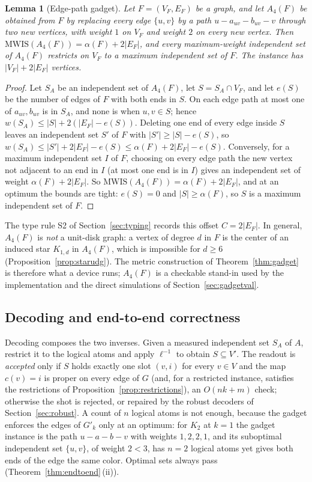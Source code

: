\documentclass[a4paper,fleqn]{cas-sc}
\newtheorem{lemma}[theorem]{Lemma}
\newcommand{\MWIS}{\mathrm{MWIS}}
\newcommand{\indep}{\alpha}
\newcommand{\rn}[1]{\textup{\textsc{\footnotesize #1}}}
\begin{document}
\begin{lemma}[Edge-path gadget]
\label{lem:pathgadget}
Let $F=(V_F,E_F)$ be a graph, and let $A_4(F)$ be obtained from $F$ by replacing
every edge $\{u,v\}$ by a path $u - a_{uv} - b_{uv} - v$ through two new
vertices, with weight $1$ on $V_F$ and weight $2$ on every new vertex. Then
$\MWIS(A_4(F)) = \indep(F) + 2|E_F|$, and every maximum-weight independent set of
$A_4(F)$ restricts on $V_F$ to a maximum independent set of $F$. The instance has
$|V_F|+2|E_F|$ vertices.
\end{lemma}

\begin{proof}
Let $S_A$ be an independent set of $A_4(F)$, let $S=S_A\cap V_F$, and let $e(S)$
be the number of edges of $F$ with both ends in $S$. On each edge path at most one
of $a_{uv},b_{uv}$ is in $S_A$, and none is when $u,v\in S$; hence
$w(S_A)\le |S| + 2(|E_F|-e(S))$. Deleting one end of every edge inside $S$ leaves
an independent set $S'$ of $F$ with $|S'|\ge|S|-e(S)$, so
$w(S_A)\le |S'| + 2|E_F| - e(S)\le \indep(F)+2|E_F|-e(S)$. Conversely, for a
maximum independent set $I$ of $F$, choosing on every edge path the new vertex not
adjacent to an end in $I$ (at most one end is in $I$) gives an independent set of
weight $\indep(F)+2|E_F|$. So $\MWIS(A_4(F))=\indep(F)+2|E_F|$, and at an optimum
the bounds are tight: $e(S)=0$ and $|S|\ge\indep(F)$, so $S$ is a maximum
independent set of $F$.
\end{proof}

\noindent The type rule \rn{S2} of Section~\ref{sec:typing} records this offset
$C=2|E_F|$. In general, $A_4(F)$ is \emph{not} a unit-disk graph: a vertex of degree $d$
in $F$ is the center of an induced star $K_{1,d}$ in $A_4(F)$, which is impossible for
$d\ge6$ (Proposition~\ref{prop:starudg}). The metric
construction of Theorem~\ref{thm:gadget} is therefore what a device runs; $A_4(F)$ is
a checkable stand-in used by the implementation and the direct simulations of
Section~\ref{sec:gadgetval}.

\subsection{Decoding and end-to-end correctness}
\label{sec:decode}

Decoding composes the two inverses. Given a measured independent set $S_A$ of $A$,
restrict it to the logical atoms and apply $\ell^{-1}$ to obtain $S\subseteq V'$. The
readout is \emph{accepted} only if $S$ holds exactly one slot $(v,i)$ for every $v\in V$
and the map $c(v)=i$ is proper on every edge of $G$ (and, for a restricted instance,
satisfies the restrictions of Proposition~\ref{prop:restrictions}), an $O(nk+m)$ check; otherwise the shot is rejected, or repaired by the robust decoders of
Section~\ref{sec:robust}. A count of $n$ logical atoms is not enough, because the
gadget enforces the edges of $G'_k$ only at an optimum: for $K_2$ at $k=1$ the gadget
instance is the path $u-a-b-v$ with weights $1,2,2,1$, and its suboptimal independent
set $\{u,v\}$, of weight $2<3$, has $n=2$ logical atoms yet gives both ends of the edge
the same color. Optimal sets always pass (Theorem~\ref{thm:endtoend}\,(ii)).
\end{document}
